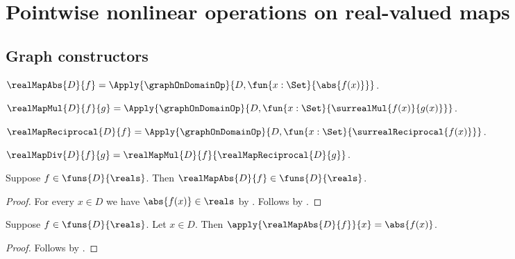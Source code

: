 



\section{Pointwise nonlinear operations on real-valued maps}

\subsection{Graph constructors}

\begin{definition}\label{real_map_abs}
    $\realMapAbs{D}{f}=\Apply{\graphOnDomainOp}
        {D,\fun{x:\Set}{\abs{f(x)}}}$.
\end{definition}

\begin{definition}\label{real_map_mul}
    $\realMapMul{D}{f}{g}=\Apply{\graphOnDomainOp}
        {D,\fun{x:\Set}{\surrealMul{f(x)}{g(x)}}}$.
\end{definition}

\begin{definition}\label{real_map_reciprocal}
    $\realMapReciprocal{D}{f}=\Apply{\graphOnDomainOp}
        {D,\fun{x:\Set}{\surrealReciprocal{f(x)}}}$.
\end{definition}

\begin{definition}\label{real_map_div}
    $\realMapDiv{D}{f}{g}=
        \realMapMul{D}{f}{\realMapReciprocal{D}{g}}$.
\end{definition}

\begin{proposition}\label{real_map_abs_type}
    Suppose $f\in\funs{D}{\reals}$.
    Then $\realMapAbs{D}{f}\in\funs{D}{\reals}$.
\end{proposition}
\begin{proof}
    For every $x\in D$ we have $\abs{f(x)}\in\reals$
        by .
    Follows by .
\end{proof}

\begin{proposition}\label{real_map_abs_apply}
    Suppose $f\in\funs{D}{\reals}$.
    Let $x\in D$.
    Then $\apply{\realMapAbs{D}{f}}{x}=\abs{f(x)}$.
\end{proposition}
\begin{proof}
    Follows by .
\end{proof}

